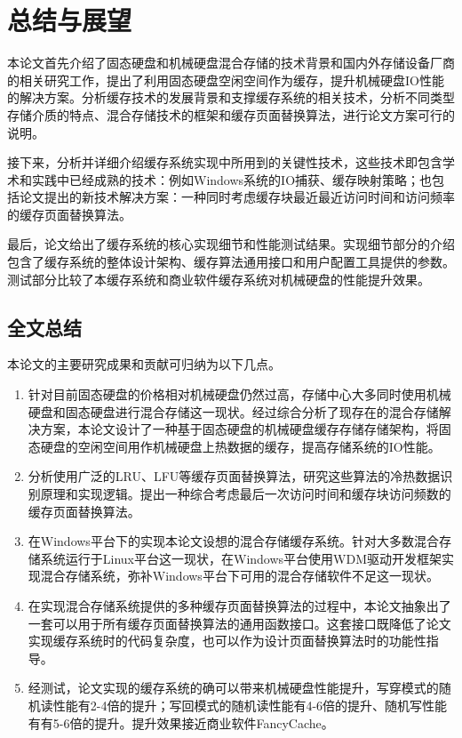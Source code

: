\chapter{总结与展望}
\label{cha:conclusions}

本论文首先介绍了固态硬盘和机械硬盘混合存储的技术背景和国内外存储设备厂商的相关研究工作，提出了利用固态硬盘空闲空间作为缓存，提升机械硬盘IO性能的解决方案。分析缓存技术的发展背景和支撑缓存系统的相关技术，分析不同类型存储介质的特点、混合存储技术的框架和缓存页面替换算法，进行论文方案可行的说明。

接下来，分析并详细介绍缓存系统实现中所用到的关键性技术，这些技术即包含学术和实践中已经成熟的技术：例如Windows系统的IO捕获、缓存映射策略；也包括论文提出的新技术解决方案：一种同时考虑缓存块最近最近访问时间和访问频率的缓存页面替换算法。

最后，论文给出了缓存系统的核心实现细节和性能测试结果。实现细节部分的介绍包含了缓存系统的整体设计架构、缓存算法通用接口和用户配置工具提供的参数。测试部分比较了本缓存系统和商业软件缓存系统对机械硬盘的性能提升效果。

\section{全文总结}
\label{sec:thesis_conclusion}
本论文的主要研究成果和贡献可归纳为以下几点。
\begin{enumerate}
\item
针对目前固态硬盘的价格相对机械硬盘仍然过高，存储中心大多同时使用机械硬盘和固态硬盘进行混合存储这一现状。经过综合分析了现存在的混合存储解决方案，本论文设计了一种基于固态硬盘的机械硬盘缓存存储存储架构，将固态硬盘的空闲空间用作机械硬盘上热数据的缓存，提高存储系统的IO性能。
\item
分析使用广泛的LRU、LFU等缓存页面替换算法，研究这些算法的冷热数据识别原理和实现逻辑。提出一种综合考虑最后一次访问时间和缓存块访问频数的缓存页面替换算法。
\item
在Windows平台下的实现本论文设想的混合存储缓存系统。针对大多数混合存储系统运行于Linux平台这一现状，在Windows平台使用WDM驱动开发框架实现混合存储系统，弥补Windows平台下可用的混合存储软件不足这一现状。
\item
在实现混合存储系统提供的多种缓存页面替换算法的过程中，本论文抽象出了一套可以用于所有缓存页面替换算法的通用函数接口。这套接口既降低了论文实现缓存系统时的代码复杂度，也可以作为设计页面替换算法时的功能性指导。
\item
经测试，论文实现的缓存系统的确可以带来机械硬盘性能提升，写穿模式的随机读性能有2-4倍的提升；写回模式的随机读性能有4-6倍的提升、随机写性能有有5-6倍的提升。提升效果接近商业软件FancyCache。
\end{enumerate}


